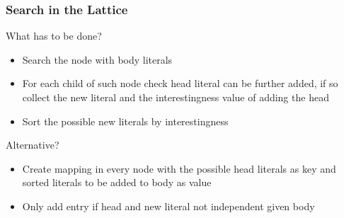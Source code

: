 \documentclass{beamer}
\begin{document}
\begin{frame} 
\frametitle{Search in the Lattice}
   What has to be done?
  \begin{itemize}
   \item Search the node with body literals
   \item For each child of such node check head literal can be further added, if so collect the new literal and the
interestingness value of adding the head
   \item Sort the possible new literals by interestingness
  \end{itemize}
  Alternative?
  \begin{itemize}
   \item Create mapping in every node with the possible head literals as key and sorted literals to be added to body as
value
   \item Only add entry if head and new literal not independent given body
  \end{itemize}
\end{frame}
\end{document}
